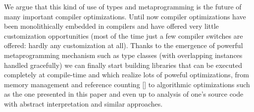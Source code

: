 We argue that this kind of use of types and metaprogramming is the future of many important compiler optimizations. Until now compiler optimizations have been monolithically embedded in compilers and have offered very little customization opportunities (most of the time just a few compiler switches are offered: hardly any customization at all). Thanks to the emergence of powerful metaprogramming mechanism such as type classes (with overlapping instances handled gracefully) we can finally start building libraries that can be executed completely at compile-time and which realize lots of poweful optimizations, from memory management and reference counting [] to algorithmic optimizations such as the one presented in this paper and even up to analysis of one's source code with abstract interpretation and similar approaches.
